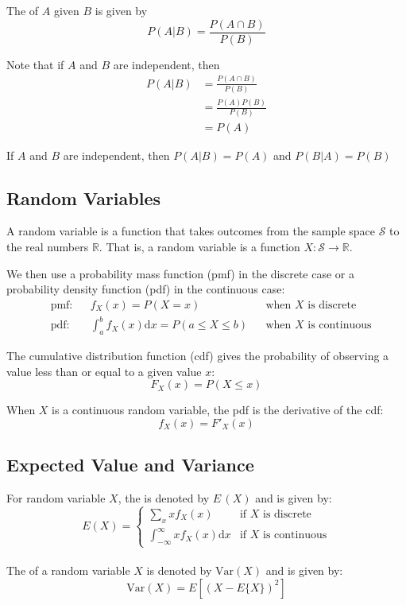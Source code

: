 \documentclass[11pt]{article}
\begin{document}
The  of $A$ given $B$ is given by \[P(A|B) = \frac{P(A \cap B)}{P(B)}\]

\begin{lemma}
    Note that if $A$ and $B$ are independent, then \begin{align*}
        P(A|B) & = \frac{P(A \cap B)}{P(B)} \\
               & = \frac{P(A)P(B)}{P(B)}    \\
               & = P(A)
    \end{align*}
\end{lemma}

\begin{corollary}
    If $A$ and $B$ are independent, then $P(A|B) = P(A)$ and $P(B|A) = P(B)$
\end{corollary}

\subsection{Random Variables}

\begin{definition}
    A random variable is a function that takes outcomes from the sample space $\mathcal{S}$ to the real numbers $\mathbb{R}$. That is, a random variable is a function $X: \mathcal{S} \to \mathbb{R}$.
\end{definition}

We then use a probability mass function (pmf) in the discrete case or a probability density function (pdf) in the continuous case:
\begin{align*}
     & \text{pmf:} &  & f_X(x) = P(X = x)                                   &  & \text{when } X \text{ is discrete}   \\
     & \text{pdf:} &  & \int_{a}^{b}f_X(x) \mathrm{d}x = P(a \leq X \leq b) &  & \text{when } X \text{ is continuous}
\end{align*}

The cumulative distribution function (cdf) gives the probability of observing a
value less than or equal to a given value $x$: \[F_X(x) = P(X \leq x)\]

When $X$ is a continuous random variable, the pdf is the derivative of the cdf: \[f_X(x) = F'_X(x)\]

\subsection{Expected Value and Variance}
For random variable $X$, the  is denoted by $E \,(X)$ and is given by:
\[
    E(X) = \begin{cases}
        \sum_{x} x f_X(x)                           & \text{if } X \text{ is discrete}   \\
        \int_{-\infty}^{\infty} x f_X(x) \mathrm{d}x & \text{if } X \text{ is continuous}
    \end{cases}
\]
\\
The  of a random variable $X$ is denoted by $\text{Var}(X)$ and is
given by:
\[
    \text{Var}(X) = E\left[(X - E\{X\})^{2}\right]
\]
\end{document}
